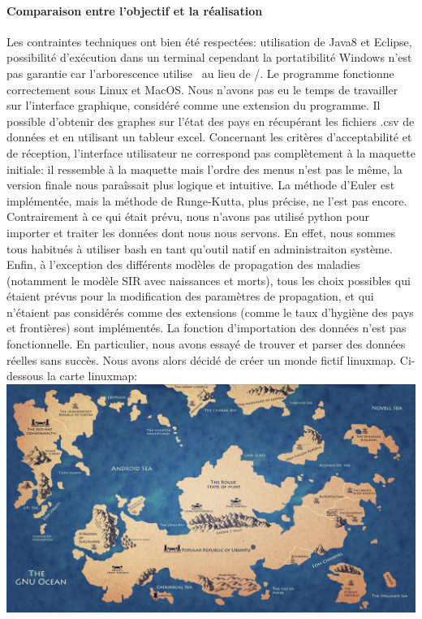 \documentclass[12pt,a4paper]{report}
\begin{document}
\paragraph{Comparaison entre l'objectif et la réalisation}
\begin{flushleft}
	Les contraintes techniques ont bien été respectées: utilisation de Java8 et Eclipse, possibilité d'exécution dans un terminal cependant la portatibilité Windows n'est pas garantie car l'arborescence utilise \ au lieu de /. Le programme fonctionne correctement sous Linux et MacOS. Nous n'avons pas eu le temps de travailler sur l'interface graphique, considéré comme une 
extension du programme. Il possible d'obtenir des graphes sur l'état des pays en récupérant les fichiers .csv de données et en utilisant un tableur excel.
Concernant les critères d'acceptabilité et de réception, l'interface utilisateur ne correspond pas complètement à la maquette initiale: il ressemble à la maquette mais l'ordre des menus n'est pas le même, la version finale nous paraîssait plus logique et 
intuitive. La méthode d'Euler est implémentée, mais la méthode de Runge-Kutta, plus précise, ne l'est pas encore.
Contrairement à ce qui était prévu, nous n'avons pas utilisé python pour importer et traiter les données dont nous nous servons. En effet, nous sommes tous habitués à utiliser bash en tant qu'outil natif en administraiton système.
Enfin, à l'exception des différents modèles de propagation des maladies (notamment le modèle SIR avec naissances et morts), tous les choix possibles qui étaient prévus pour la modification des paramètres de propagation, et qui n'étaient pas considérés comme 
des extensions (comme le taux d'hygiène des pays et frontières) sont implémentés.
La fonction d'importation des données n'est pas fonctionnelle. En particulier, nous avons essayé de trouver et parser des données réelles sans succès. Nous avons alors décidé de créer un monde fictif linuxmap. Ci-dessous la carte linuxmap:
\includegraphics[angle=270 , scale=0.5]{linuxmap.jpg}


\end{flushleft}
\end{document}
